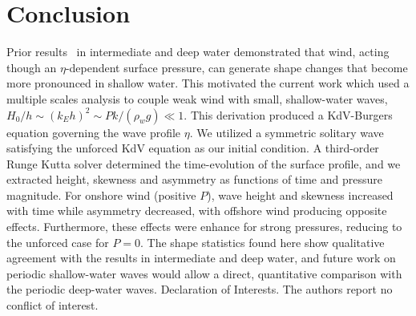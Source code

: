 \documentclass{jfm}
\begin{document}
\section{Conclusion}
Prior results~\citep{zdyrski2020wind} in intermediate and deep water
demonstrated that wind, acting though an $\eta$-dependent surface
pressure, can generate shape changes that become more pronounced in
shallow water.
This motivated the current work which used a multiple scales analysis to
couple weak wind with small, shallow-water waves, \ie{} $H_0/h \sim (k_E
h)^2 \sim P k/(\rho_w g) \ll 1$.
This derivation produced a KdV-Burgers equation governing the wave
profile $\eta$.
We utilized a symmetric solitary wave satisfying the unforced KdV
equation as our initial condition.
A third-order Runge Kutta solver determined the time-evolution of the
surface profile, and we extracted height, skewness and asymmetry as
functions of time and pressure magnitude.
For onshore wind (positive $P$), wave height and skewness increased with
time while asymmetry decreased, with offshore wind producing opposite
effects.
Furthermore, these effects were enhance for strong pressures, reducing
to the unforced case for $P=0$.
The shape statistics found here show qualitative agreement with the
results in intermediate and deep water, and future work on periodic
shallow-water waves would allow a direct, quantitative comparison with
the periodic deep-water waves.
Declaration of Interests. The authors report no conflict of interest.

\appendix



\end{document}
